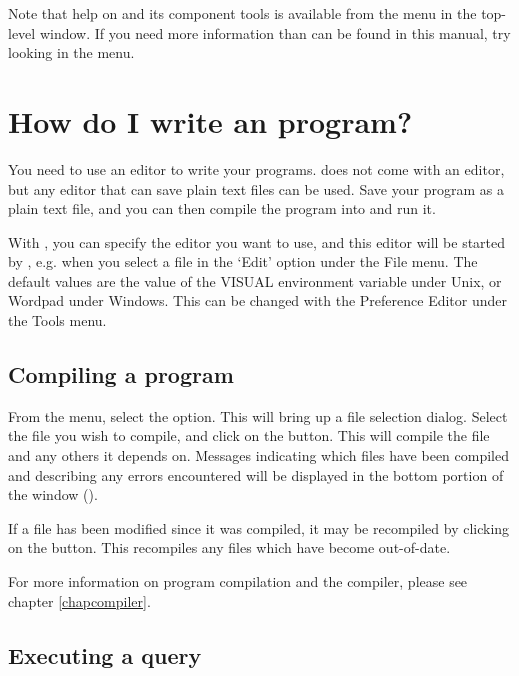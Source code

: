 Note that help on {\tkeclipse} and its component tools is available from the
 menu in the top-level window.
If you need more information than can be found in this manual, try looking
in the  menu.

\section{How do I write an {\eclipse} program?}
You need to use an editor to write your programs. {\eclipse} does not come
with an editor, but any editor that can save plain text files can be used. 
Save your program as a plain text file, and you can then compile the
program into {\eclipse} and run it.

With {\tkeclipse}, you can specify the editor you want to use, and this
editor will be started by {\tkeclipse}, e.g. when you select a file in
the `Edit' option under the File menu. The default values are the value of
the VISUAL environment variable  under Unix, or Wordpad under Windows.
This can be changed with the Preference Editor under the Tools menu.

\subsection{Compiling a program}

From the  menu, select the  option.
This will bring up a file selection dialog.
Select the file you wish to compile, and click on the  button.
This will compile the file and any others it depends on.
Messages indicating which files have been compiled and describing any errors
encountered will be displayed in the bottom portion of the {\tkeclipse}
window ().

If a file has been modified since it was compiled,
it may be recompiled by clicking on the  button.
This recompiles any files which have become out-of-date.

For more information on program compilation and the compiler, please see
chapter \ref{chapcompiler}.

\subsection{Executing a query}

